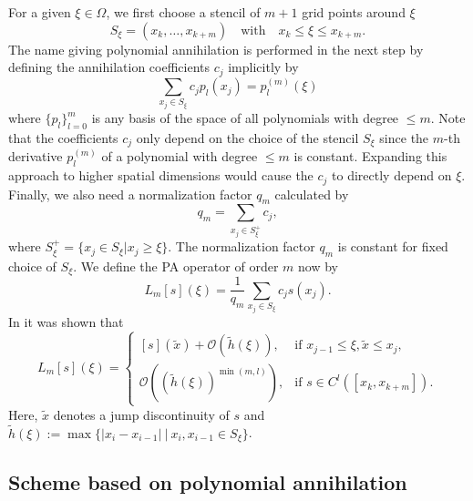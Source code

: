 For a given $\xi\in\Omega$, we first choose a stencil of $m+1$ grid points around $\xi$
\begin{equation}
 S_\xi = (x_k,\ldots, x_{k+m})\hspace{1em}\text{with}\hspace{1em} x_k\leq \xi\leq x_{k+m}.
\end{equation}
The name giving polynomial annihilation is performed in the next step by defining the annihilation coefficients $c_j$ implicitly by
\begin{equation}
 \sum_{x_j\in S_\xi} c_j p_l(x_j) = p_l^{(m)}(\xi)
\end{equation}
where $\{p_l\}_{l=0}^m$ is any basis of the space of all polynomials with degree $\leq m$. Note that the coefficients $c_j$ only depend on the choice of the stencil $S_\xi$ since the $m$-th derivative $p_l^{(m)}$ of a polynomial with degree $\leq m$ is constant. Expanding this approach to higher spatial dimensions would cause the $c_j$ to directly depend on $\xi$.
Finally, we also need a normalization factor $q_m$ calculated by
\begin{equation}
 q_m = \sum_{x_j\in S_\xi^+} c_j,
\end{equation}
where $S_\xi^+ = \{x_j\in S_\xi| x_j\geq\xi\}$. The normalization factor $q_m$ is constant for fixed choice of $S_\xi$. We define the PA operator of order $m$ now by
\begin{equation}
 L_m[s](\xi) = \frac{1}{q_m} \sum_{x_j\in S_\xi} c_j s(x_j).
\end{equation}
In \cite{archibald2005polynomial} it was shown that
\begin{equation}
 L_m[s](\xi) =\begin{cases}
 			   [s](\tilde{x}) + \mathcal{O}\left(\tilde{h}(\xi) \right), &\text{if } x_{j-1}\leq\xi,\tilde{x}\leq x_j,\\
 			   \mathcal{O}\left( (\tilde{h}(\xi))^{\min(m,l) }\right) , & \text{if } s\in C^l([x_k,x_{k+m}]).
 			  \end{cases}
\end{equation}
Here, $\tilde{x}$ denotes a jump discontinuity of $s$ and $\tilde{h}(\xi):=\max\{|x_i-x_{i-1}|~|~x_i,x_{i-1}\in S_\xi \}$.

\subsection{Scheme based on polynomial annihilation}

